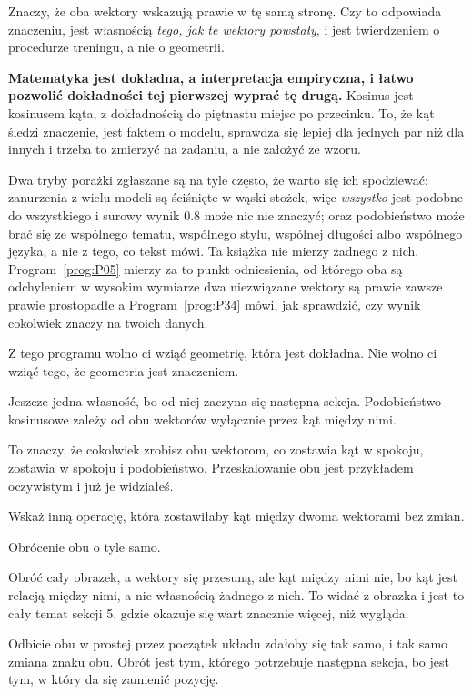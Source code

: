 \begin{fr}
Znaczy, że oba wektory wskazują prawie w tę samą stronę. Czy to odpowiada
znaczeniu, jest własnością \emph{tego, jak te wektory powstały}, i jest
twierdzeniem o procedurze treningu, a nie o geometrii.

\begin{trapbox}
\textbf{Matematyka jest dokładna, a interpretacja empiryczna, i łatwo pozwolić
dokładności tej pierwszej wyprać tę drugą.} Kosinus jest kosinusem kąta, z
dokładnością do piętnastu miejsc po przecinku. To, że kąt śledzi znaczenie,
jest faktem o modelu, sprawdza się lepiej dla jednych par niż dla innych i
trzeba to zmierzyć na zadaniu, a nie założyć ze wzoru.

Dwa tryby porażki zgłaszane są na tyle często, że warto się ich spodziewać:
zanurzenia z wielu modeli są ściśnięte w wąski stożek, więc \emph{wszystko}
jest podobne do wszystkiego i surowy wynik $\num{0.8}$ może nic nie znaczyć;
oraz podobieństwo może brać się ze wspólnego tematu, wspólnego stylu, wspólnej
długości albo wspólnego języka, a nie z tego, co tekst mówi. Ta książka nie
mierzy żadnego z nich. Program~\ref{prog:P05} mierzy za to punkt odniesienia,
od którego oba są odchyleniem \dash{} w wysokim wymiarze dwa niezwiązane
wektory są prawie zawsze prawie prostopadłe \dash{} a Program~\ref{prog:P34}
mówi, jak sprawdzić, czy wynik cokolwiek znaczy na twoich danych.

Z tego programu wolno ci wziąć geometrię, która jest dokładna. Nie wolno ci
wziąć tego, że geometria jest znaczeniem.
\end{trapbox}

\end{fr}

\begin{fr}
Jeszcze jedna własność, bo od niej zaczyna się następna sekcja. Podobieństwo
kosinusowe zależy od obu wektorów wyłącznie przez kąt między nimi.

To znaczy, że cokolwiek zrobisz obu wektorom, co zostawia kąt w spokoju,
zostawia w spokoju i podobieństwo. Przeskalowanie obu jest przykładem
oczywistym i już je widziałeś.

Wskaż inną operację, która zostawiłaby kąt między dwoma wektorami bez zmian.
\nextframe
\end{fr}

\begin{fr}
\begin{ansblock}
Obrócenie obu o tyle samo.
\end{ansblock}

Obróć cały obrazek, a wektory się przesuną, ale kąt między nimi nie, bo kąt
jest relacją między nimi, a nie własnością żadnego z nich. To widać z obrazka
i jest to cały temat sekcji 5, gdzie okazuje się wart znacznie więcej, niż
wygląda.

Odbicie obu w prostej przez początek układu zdałoby się tak samo, i tak samo
zmiana znaku obu. Obrót jest tym, którego potrzebuje następna sekcja, bo jest
tym, w który da się zamienić pozycję.
\end{fr}

